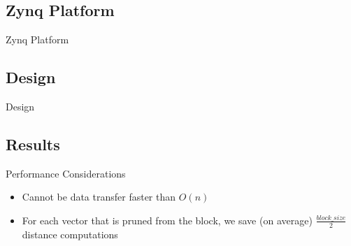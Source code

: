 \subsection{Zynq Platform}
\begin{frame}[label=zynq]{Zynq Platform}
\end{frame}

\subsection{Design}
\begin{frame}[label=design]{Design}
\end{frame}

\subsection{Results}
\begin{frame}[label=performance-considerations]{Performance Considerations}
    \begin{itemize}
        \item Cannot be data transfer faster than $O(n)$
        \item For each vector that is pruned from the block, we save (on
            average) $\frac{block\_size}{2}$ distance computations
    \end{itemize}
\end{frame}

